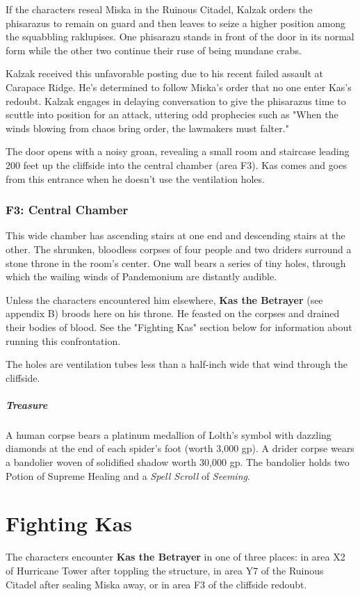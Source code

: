 \documentclass[10pt,a4paper,twoside,bg=print,twocolumn,openany,nodeprecatedcode]{dndbook}
\begin{document}
If the characters reseal Miska in the Ruinous Citadel, Kalzak orders the phisarazus to remain on guard and then leaves to seize a higher position among the squabbling raklupises. One phisarazu stands in front of the door in its normal form while the other two continue their ruse of being mundane crabs.

Kalzak received this unfavorable posting due to his recent failed assault at Carapace Ridge. He's determined to follow Miska's order that no one enter Kas's redoubt. Kalzak engages in delaying conversation to give the phisarazus time to scuttle into position for an attack, uttering odd prophecies such as "When the winds blowing from chaos bring order, the lawmakers must falter."

The door opens with a noisy groan, revealing a small room and staircase leading 200 feet up the cliffside into the central chamber (area F3). Kas comes and goes from this entrance when he doesn't use the ventilation holes.

\subsubsection{F3: Central Chamber}
\begin{DndReadAloud}{}
This wide chamber has ascending stairs at one end and descending stairs at the other. The shrunken, bloodless corpses of four people and two driders surround a stone throne in the room's center. One wall bears a series of tiny holes, through which the wailing winds of Pandemonium are distantly audible.

\end{DndReadAloud}

Unless the characters encountered him elsewhere, \textbf{Kas the Betrayer} (see appendix B) broods here on his throne. He feasted on the corpses and drained their bodies of blood. See the "Fighting Kas" section below for information about running this confrontation.

The holes are ventilation tubes less than a half-inch wide that wind through the cliffside.

\subparagraph{Treasure}
A human corpse bears a platinum medallion of Lolth's symbol with dazzling diamonds at the end of each spider's foot (worth 3,000 gp). A drider corpse wears a bandolier woven of solidified shadow worth 30,000 gp. The bandolier holds two Potion of Supreme Healing and a \textit{Spell Scroll} of \textit{Seeming}.

\section{Fighting Kas}
The characters encounter \textbf{Kas the Betrayer} in one of three places: in area X2 of Hurricane Tower after toppling the structure, in area Y7 of the Ruinous Citadel after sealing Miska away, or in area F3 of the cliffside redoubt.
\end{document}
